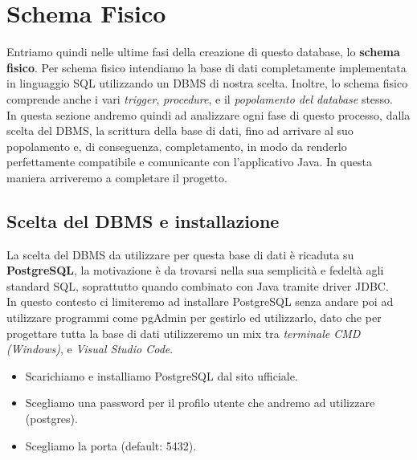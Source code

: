 \documentclass[a4paper, 12pt]{article}
\begin{document}
    \newpage

\section{Schema Fisico}
    Entriamo quindi nelle ultime fasi della creazione di questo database, lo \textbf{schema fisico}. Per schema fisico intendiamo la base di dati completamente implementata in linguaggio SQL utilizzando un DBMS di nostra scelta. Inoltre, lo schema fisico comprende anche i vari \textit{trigger}, \textit{procedure}, e il \textit{popolamento del database} stesso.\\[0.2cm]
    In questa sezione andremo quindi ad analizzare ogni fase di questo processo, dalla scelta del DBMS, la scrittura della base di dati, fino ad arrivare al suo popolamento e, di conseguenza, completamento, in modo da renderlo perfettamente compatibile e comunicante con l'applicativo Java. In questa maniera arriveremo a completare il progetto.

    \subsection{Scelta del DBMS e installazione}
    La scelta del DBMS da utilizzare per questa base di dati è ricaduta su \textbf{PostgreSQL}, la motivazione è da trovarsi nella sua semplicità e fedeltà agli standard SQL, soprattutto quando combinato con Java tramite driver JDBC.\\[0.2cm]
    In questo contesto ci limiteremo ad installare PostgreSQL senza andare poi ad utilizzare programmi come pgAdmin per gestirlo ed utilizzarlo, dato che per progettare tutta la base di dati utilizzeremo un mix tra \textit{terminale CMD (Windows)}, e \textit{Visual Studio Code}.
    \begin{itemize}
        \item Scarichiamo e installiamo PostgreSQL dal sito ufficiale.
        \item Scegliamo una password per il profilo utente che andremo ad utilizzare (postgres).
        \item Scegliamo la porta (default: 5432).
    \end{itemize}
\end{document}
